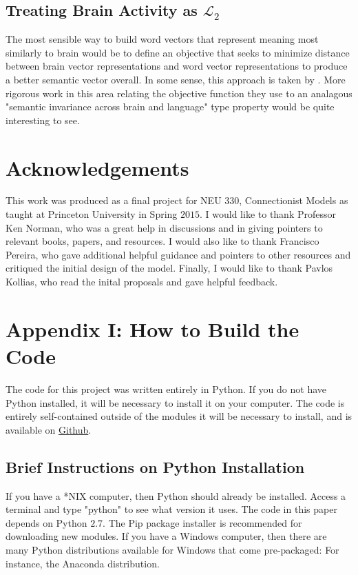 \documentclass[12pt, usenames]{article}
\theoremstyle{definition}
\theoremstyle{definition}
\theoremstyle{definition}
\newcommand{\mc}[1]
{\mathcal{#1}}
\begin{document}
\subsection{Treating Brain Activity as $\mc{L}_2$}
The most sensible way to build word vectors that represent meaning most similarly 
to brain would be to define an objective that seeks to minimize distance between brain vector representations and word vector representations to produce a better semantic vector overall. In some sense, this approach is taken by \cite{Fyshe2014}. More rigorous work in this area relating the objective function they use to an analagous "semantic invariance across brain and language" type property would be quite interesting to see. 


\section{Acknowledgements}

This work was produced as a final project for NEU $330$, Connectionist Models as taught at Princeton University in Spring $2015$. I would like to thank Professor Ken Norman, who was a great help in discussions and in giving pointers to relevant books, papers, and resources. I would also like to thank Francisco Pereira, who gave additional helpful guidance and pointers to other resources and critiqued the initial design of the model. Finally, I would like to thank Pavlos Kollias, who read the inital proposals and gave helpful feedback. 

\section{Appendix I: How to Build the Code}

The code for this project was written entirely in Python. If you do not have Python installed, it will be necessary to install it on your computer. The code is entirely self-contained outside of the modules it will be necessary to install, and is available on \href{https://github.com/kiranvodrahalli/hebb_vectors}{Github}. 

\subsection{Brief Instructions on Python Installation}

If you have a *NIX computer, then Python should already be installed. Access a terminal and type "python" to see what version it uses. The code in this paper depends on Python $2.7$. The Pip package installer is recommended for downloading new modules. If you have a Windows computer, then there are many Python distributions available for Windows that come pre-packaged: For instance, the Anaconda distribution.
\end{document}
